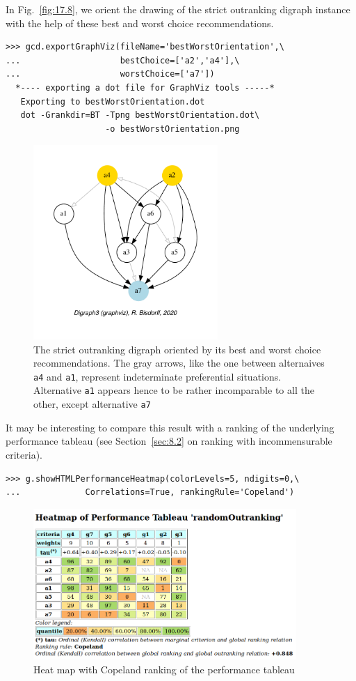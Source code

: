 In Fig.~\vref{fig:17.8}, we orient the drawing of the strict outranking digraph instance with the help of these best and worst choice recommendations. 
\begin{lstlisting}
>>> gcd.exportGraphViz(fileName='bestWorstOrientation',\
...                    bestChoice=['a2','a4'],\
...                    worstChoice=['a7'])
  *---- exporting a dot file for GraphViz tools -----*
   Exporting to bestWorstOrientation.dot
   dot -Grankdir=BT -Tpng bestWorstOrientation.dot\
                    -o bestWorstOrientation.png
\end{lstlisting}
\begin{figure}[h]
\sidecaption[t]
\includegraphics[width=7cm]{Figures/17-8-bestWorstOrientation.pdf}
\caption{The strict outranking digraph oriented by its best and worst choice recommendations. The gray arrows, like the one between alternaives \texttt{a4} and \texttt{a1}, represent indeterminate preferential situations. Alternative \texttt{a1} appears hence to be rather incomparable to all the other, except alternative \texttt{a7}}
\label{fig:17.8}       %
\end{figure}

It may be interesting to compare this result with a \Copeland ranking of the underlying performance tableau (see Section~\vref{sec:8.2} on ranking with incommensurable criteria).
\begin{lstlisting}
>>> g.showHTMLPerformanceHeatmap(colorLevels=5, ndigits=0,\
...             Correlations=True, rankingRule='Copeland')
\end{lstlisting}
\begin{figure}[h]
\includegraphics[width=10cm]{Figures/17-9-outRankingResult.png}
\caption{Heat map with Copeland ranking of the performance tableau}
\label{fig:17.9}       %
\end{figure}

